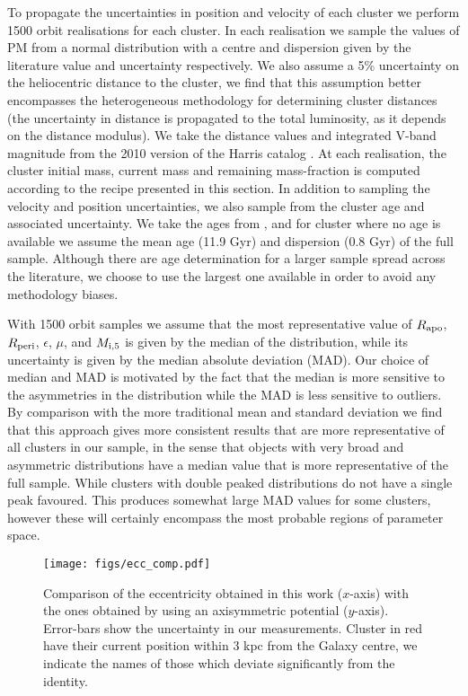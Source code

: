 \documentclass[useAMS,usenatbib,fleqn]{mnras}
\newcommand{\rapo}{R_{\rm apo}}
\newcommand{\rperi}{R_{\rm peri}}
\newcommand{\comm}[1]{#1}
\begin{document}
To propagate the uncertainties in position and velocity of each cluster we
perform 1500 orbit realisations for each cluster. In each realisation we sample
the values of PM from a normal distribution with a centre and dispersion given
by the literature value and uncertainty respectively. We also assume a 5\%
uncertainty on the heliocentric distance to the cluster, we find that this
assumption better encompasses the heterogeneous methodology for determining
cluster distances \comm{(the uncertainty in distance is propagated to the total
luminosity, as it depends on the distance modulus)}. We take the distance values
and integrated V-band magnitude from the  2010 version of the Harris catalog
\citep{Harris96, 2010arXiv1012.3224H}. At each realisation, the cluster initial
mass, current mass and remaining mass-fraction is computed according to the
recipe presented in this section. \comm{In addition to sampling the velocity and
position uncertainties, we also sample from the cluster age and associated
uncertainty. We take the ages from \citet{vdb13}, and for cluster where no age
is available we assume the mean age (11.9 Gyr) and dispersion (0.8 Gyr) of the
full sample. Although there are age determination for a larger sample spread
across the literature, we choose to use the largest one available in order to
avoid any methodology biases.}

With 1500 orbit samples we assume that the most representative value of $\rapo$,
$\rperi$, $\epsilon$, $\mu$, and $M_{{\rm i},5}$ is given by the median of the
distribution, while its uncertainty is given by the median absolute deviation
(MAD). Our choice of median and MAD is motivated by the fact that the median is
more sensitive to the asymmetries in the distribution while the MAD is less
sensitive to outliers. By comparison with the more traditional mean and standard
deviation we find that this approach gives more consistent results that are more
representative of all clusters in our sample, \comm{in the sense that objects
with very broad and asymmetric distributions have a median value that is more
representative of the full sample. While clusters with double peaked
distributions do not have a single peak favoured. This produces somewhat large
MAD values for some clusters, however these will certainly encompass the most
probable regions of parameter space.}

\begin{figure}
\centering
\texttt{[image: figs/ecc\_comp.pdf]}
    \caption{Comparison of the eccentricity obtained in this work ($x$-axis)
    with the ones obtained by \citep{mpv14} using an axisymmetric potential
    ($y$-axis).  Error-bars show the uncertainty in our measurements.
    \comm{Cluster in red have their current position within 3 kpc from the
    Galaxy centre, we indicate the names of those which deviate significantly
    from the identity.}}
\label{fig:ecc_comp}
\end{figure}
\end{document}
